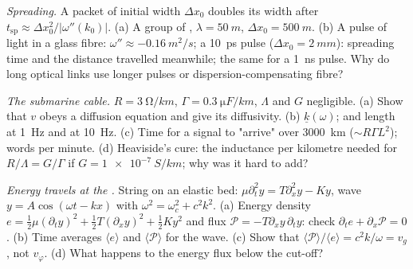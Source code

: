 \begin{exercise}[$\star\star$]\label{exo:b2:dispersion-wave-packets:8}
\emph{Spreading.} A packet of initial width $\Delta x_0$ doubles its width
after $t_{\text{sp}} \approx \Delta x_0^2/|\omega''(k_0)|$. (a) A group of , $\lambda = \qty{50}{m}$, $\Delta x_0 = \qty{500}{m}$. (b) A pulse of light in
a glass fibre: $\omega'' \approx \qty{-0.16}{m^2/s}$; a \qty{10}{ps} pulse ($\Delta x_0 =
\qty{2}{mm}$): spreading time and the distance travelled meanwhile; the same
for a \qty{1}{ns} pulse. Why do long optical links use longer pulses or
dispersion-compensating fibre?
\end{exercise}

\begin{exercise}[$\star\star$]\label{exo:b2:dispersion-wave-packets:9}
\emph{The submarine cable.} $R = \qty{3}{\ohm/km}$, $\Gamma = \qty{0.3}{\micro F/km}$,
$\Lambda$ and $G$ negligible. (a) Show that $v$ obeys a diffusion equation and
give its diffusivity. (b)  $\underline k(\omega)$;  and  length at \qty{1}{Hz} and at \qty{10}{Hz}. (c)
Time for a signal to "arrive" over \qty{3000}{km} ($\sim R\Gamma L^2$); words per
minute. (d) Heaviside's cure: the inductance per kilometre needed for
$R/\Lambda = G/\Gamma$ if $G = \qty{1e-7}{S/km}$; why was it hard to add?
\end{exercise}

\begin{exercise}[$\star\star\star$]\label{exo:b2:dispersion-wave-packets:10}
\emph{Energy travels at the .} String on an elastic bed:
$\mu\partial_t^2y = T\partial_x^2y - Ky$, wave $y = A\cos(\omega t - kx)$ with $\omega^2 =
\omega_c^2 + c^2k^2$. (a) Energy density $e = \tfrac12\mu(\partial_ty)^2 + \tfrac12T
(\partial_xy)^2 + \tfrac12Ky^2$ and flux $\mathcal P = -T\partial_xy\,\partial_ty$: check
$\partial_te + \partial_x\mathcal P = 0$. (b) Time averages $\langle e\rangle$ and
$\langle\mathcal P\rangle$ for the wave. (c) Show that $\langle\mathcal P\rangle/
\langle e\rangle = c^2k/\omega = v_g$, not $v_\varphi$. (d) What happens to the
energy flux below the cut-off?
\end{exercise}

